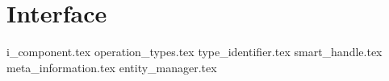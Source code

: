 \section{Interface}
{i_component.tex}
{operation_types.tex}
{type_identifier.tex}
{smart_handle.tex}
{meta_information.tex}
{entity_manager.tex}
